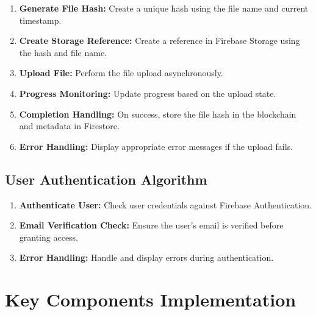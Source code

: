 \documentclass[12pt,a4paper]{report}
\begin{document}

   
\begin{enumerate}
   \item \textbf{Generate File Hash:} Create a unique hash using the file name and current timestamp.
   \item \textbf{Create Storage Reference:} Create a reference in Firebase Storage using the hash and file name.
   \item \textbf{Upload File:} Perform the file upload asynchronously.
   \item \textbf{Progress Monitoring:} Update progress based on the upload state.
   \item \textbf{Completion Handling:} On success, store the file hash in the blockchain and metadata in Firestore.
   \item \textbf{Error Handling:} Display appropriate error messages if the upload fails.
\end{enumerate}

\subsection{User Authentication Algorithm}
\begin{enumerate}
   \item \textbf{Authenticate User:} Check user credentials against Firebase Authentication.
   \item \textbf{Email Verification Check:} Ensure the user’s email is verified before granting access.
   \item \textbf{Error Handling:} Handle and display errors during authentication.
\end{enumerate}


\section{Key Components Implementation}
\end{document}

